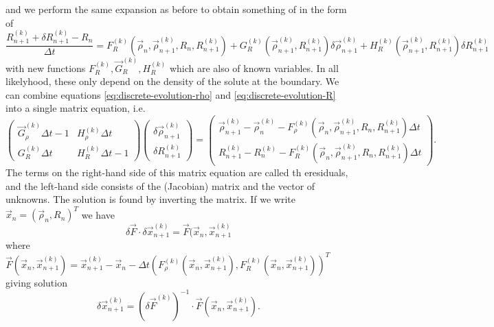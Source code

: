 \documentclass[11pt,twoside]{report}
\begin{document}
and we perform the same expansion as before to obtain something of in the form of
\begin{equation}\label{eq:discrete-evolution-R}
  \frac{R_{n+1}^{(k)} + \delta R_{n+1}^{(k)} - R_n}{\Delta t}
  =
  F_R^{(k)} (\vec{\rho}_n, \vec{\rho}_{n+1}^{(k)}, R_n, R_{n+1}^{(k)}) +
  G_R^{(k)} (\vec{\rho}_{n+1}^{(k)}, R_{n+1}^{(k)}) \delta \vec{\rho}_{n+1}^{(k)} +
  H_R^{(k)} (\vec{\rho}_{n+1}^{(k)}, R_{n+1}^{(k)}) \delta R_{n+1}^{(k)}
\end{equation}
with new functions $F_R^{(k)},\vec{G}_R^{(k)},H_R^{(k)}$ which are also of known variables.
In all likelyhood, these only depend on the density of the solute at the boundary.
We can combine equations \eqref{eq:discrete-evolution-rho} and \eqref{eq:discrete-evolution-R} into a single matrix equation, i.e.
\begin{equation}
  \begin{pmatrix}
    \vec{G}_\rho^{(k)} \Delta t - 1 & H_\rho^{(k)} \Delta t \\
    G_R^{(k)} \Delta t & H_R^{(k)} \Delta t - 1
  \end{pmatrix}
  \begin{pmatrix}
    \delta \vec{\rho}_{n+1}^{(k)} \\
    \delta R_{n+1}^{(k)}
  \end{pmatrix}
  =
  \begin{pmatrix}
    \vec{\rho}_{n+1}^{(k)} - \vec{\rho}_n^{(k)} -
    F_\rho^{(k)} (\vec{\rho}_n, \vec{\rho}_{n+1}^{(k)}, R_n, R_{n+1}^{(k)})
    \Delta t
    \\
    R_{n+1}^{(k)} - R_n^{(k)} -
    F_R^{(k)} (\vec{\rho}_n, \vec{\rho}_{n+1}^{(k)}, R_n, R_{n+1}^{(k)})
    \Delta t
  \end{pmatrix}.
\end{equation}
The terms on the right-hand side of this matrix equation are called th eresiduals, and the left-hand side consists of the (Jacobian) matrix and the vector of unknowns.
The solution is found by inverting the matrix.
If we write $\vec{x}_n = (\vec{\rho}_n, R_n)^T$ we have
\begin{equation}
  \delta \vec{F} \cdot \delta \vec{x}_{n+1}^{(k)} =
  \vec{F}(\vec{x}_n, \vec{x}_{n+1}^{(k)}
\end{equation}
where $\vec{F}(\vec{x}_n, \vec{x}_{n+1}^{(k)}) = \vec{x}_{n+1}^{(k)} - \vec{x}_n - \Delta t (F_\rho^{(k)} (\vec{x}_n, \vec{x}_{n+1}^{(k)}), F_R^{(k)} (\vec{x}_n, \vec{x}_{n+1}^{(k)}))^T$ giving solution
\begin{equation}
  \delta \vec{x}_{n+1}^{(k)} =
  (\delta \vec{F}^{(k)})^{-1} \cdot \vec{F}(\vec{x}_n, \vec{x}_{n+1}^{(k)}).
\end{equation}
\end{document}
